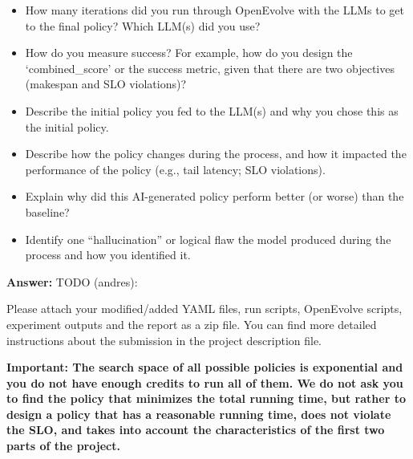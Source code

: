 \begin{enumerate}
\begin{enumerate}
        \begin{itemize}
            \item How many iterations did you run through OpenEvolve with the LLMs to get to the final policy? Which LLM(s) did you use?
            \item How do you measure success? For example, how do you design the `combined\_score' or the success metric, given that there are two objectives (makespan and SLO violations)?
            \item Describe the initial policy you fed to the LLM(s) and why you chose this as the initial policy.
            \item Describe how the policy changes during the process, and how it impacted the performance of the policy (e.g., tail latency; SLO violations).
            \item Explain why did this AI-generated policy perform better (or worse) than the baseline?
            \item Identify one ``hallucination'' or logical flaw the model produced during the process and how you identified it.
        \end{itemize}

         \textbf{Answer:}
         TODO (andres): 


    \end{enumerate}

    Please attach your modified/added YAML files, run scripts, OpenEvolve scripts, experiment outputs and the report as a zip file. You can find more detailed instructions about the submission in the project description file.
    
    \textbf{Important: The search space of all possible policies is exponential and you do not have enough credits to run all of them. We do not ask you to find the policy that minimizes
    the total running time, but rather to design a policy that has a reasonable running time, does not violate the SLO, and takes into account the characteristics of the first two parts of the project.}
\end{enumerate}

\newpage
